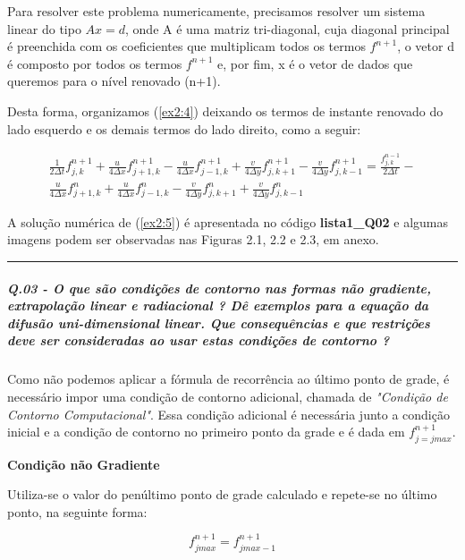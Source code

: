 \documentclass[11pt]{article}
\begin{document}
Para resolver este problema numericamente, precisamos resolver um
sistema linear do tipo \(Ax=d\), onde A é uma matriz tri-diagonal, cuja
diagonal principal é preenchida com os coeficientes que multiplicam
todos os termos \(f^{n+1}\), o vetor d é composto por todos os termos
\(f^{n+1}\) e, por fim, x é o vetor de dados que queremos para o nível
renovado (n+1).

Desta forma, organizamos (\ref{ex2:4}) deixando os termos de instante
renovado do lado esquerdo e os demais termos do lado direito, como a
seguir:

\begin{equation}
\begin{aligned}
    \frac{1}{2\Delta{t}}f^{n+1}_{j,k} + \frac{u}{4\Delta{x}}f^{n+1}_{j+1,k} - \frac{u}{4\Delta{x}}f^{n+1}_{j-1,k} + \frac{v}{4\Delta{y}}f^{n+1}_{j,k+1} - \frac{v}{4\Delta{y}}f^{n+1}_{j,k-1} = 
    \frac{f^{n-1}_{j,k}}{2\Delta{t}} - \\
    \frac{u}{4\Delta{x}}f^{n}_{j+1,k} + \frac{u}{4\Delta{x}}f^{n}_{j-1,k} -
    \frac{v}{4\Delta{y}}f^{n}_{j,k+1} + \frac{v}{4\Delta{y}}f^{n}_{j,k-1}
    \label{ex2:5}
\end{aligned}
\end{equation}

A solução numérica de (\ref{ex2:5}) é apresentada no código
\textbf{lista1\_Q02} e algumas imagens podem ser observadas nas Figuras
2.1, 2.2 e 2.3, em anexo.

    \begin{center}\rule{0.5\linewidth}{\linethickness}\end{center}

    \subparagraph{Q.03 - O que são condições de contorno nas formas não
gradiente, extrapolação linear e radiacional ? Dê exemplos para a
equação da difusão uni-dimensional linear. Que consequências e que
restrições deve ser consideradas ao usar estas condições de contorno
?}

Como não podemos aplicar a fórmula de recorrência ao último ponto de
grade, é necessário impor uma condição de contorno adicional, chamada de
\emph{"Condição de Contorno Computacional"}. Essa condição adicional é
necessária junto a condição inicial e a condição de contorno no primeiro
ponto da grade e é dada em \(f^{n+1}_{j=jmax}\).

\textbf{Condição não Gradiente}

Utiliza-se o valor do penúltimo ponto de grade calculado e repete-se no
último ponto, na seguinte forma:

\begin{equation}
    f^{n+1}_{jmax} = f^{n+1}_{jmax-1}
\end{equation}
\end{document}
